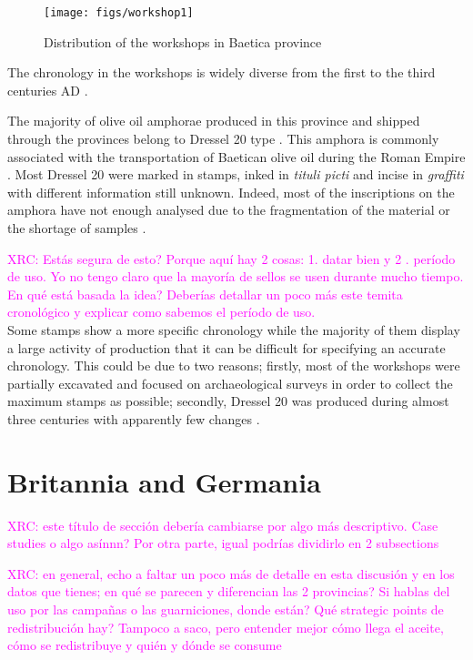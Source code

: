 \documentclass[review]{elsarticle}
\newcommand{\memo}[2]{\textcolor{#1}{#2}}
\newcommand{\xavi}[1]{\memo{magenta}{XRC: #1\\}}
\begin{document}
\begin{figure}[htp]
	\centering
\texttt{[image: figs/workshop1]}
\caption{Distribution of the workshops in Baetica province}
\label{workshop}
\end{figure} 


The chronology in the workshops is widely diverse from the first to the third centuries AD \citep{millet_anforas_1998,rodriguez_baetican_1998,chic2005comercio}. 

The majority of olive oil amphorae produced in this province and shipped through the provinces belong to Dressel 20 type \citep{dressel_ricerche_1878,
millet_anforas_1998}. This amphora is commonly associated with the transportation of Baetican olive oil during the Roman Empire \citep{berni_millet_epigrafianforica_2008}. Most Dressel 20 were marked in stamps, inked in \textit{tituli picti} and incise in \textit{graffiti} with different information still unknown. Indeed, most of the inscriptions on the amphora have not enough analysed due to the fragmentation of the material or the shortage of samples \citep{aguilera_evolucion_2007,rovira_guardiola_grafitos_2007}. 


\xavi{Estás segura de esto? Porque aquí hay 2 cosas: 1. datar bien y 2 . período de uso. Yo no tengo claro que la mayoría de sellos se usen durante mucho tiempo. En qué está basada la idea? Deberías detallar un poco más este temita cronológico y explicar como sabemos el período de uso.}
Some stamps show a more specific chronology while the majority of them display a large activity of production that it can be difficult for specifying an accurate chronology. This could be due to two reasons; firstly, most of the workshops were partially excavated and focused on archaeological surveys in order to collect the maximum stamps as possible; secondly, Dressel 20 was produced during almost three centuries with apparently few changes \citep{berni_piero_chapter_2017}.

\section{Britannia and Germania}
\xavi{este título de sección debería cambiarse por algo más descriptivo. Case studies o algo asínnn? Por otra parte, igual podrías dividirlo en 2 subsections}

\xavi{en general, echo a faltar un poco más de detalle en esta discusión y en los datos que tienes; en qué se parecen y diferencian las 2 provincias? Si hablas del uso por las campañas o las guarniciones, donde están? Qué strategic points de redistribución hay? Tampoco a saco, pero entender mejor cómo llega el aceite, cómo se redistribuye y quién y dónde se consume}
\end{document}
